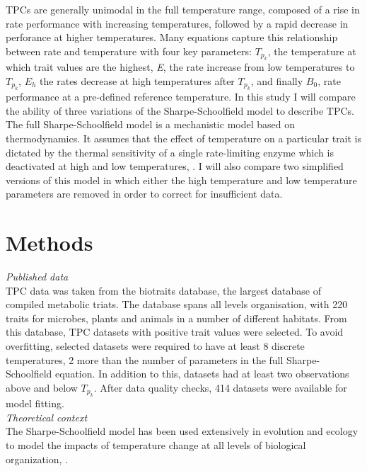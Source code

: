 \documentclass[11pt]{article}
\begin{document}
\noindent
TPCs are generally unimodal in the full temperature range, composed of a rise in rate performance with increasing temperatures, followed by a rapid decrease in perforance at higher temperatures. Many equations capture this relationship between rate and temperature with four key parameters: ${T_p_k}$, the temperature at which trait values are the highest, \textit{E}, the rate increase from low temperatures to ${T_p_k}$, ${E_h}$ the rates decrease at high temperatures after ${T_p_k}$, and finally ${B_0}$, rate performance at a pre-defined reference temperature. In this study I will compare the ability of three variations of the Sharpe-Schoolfield model to describe TPCs. The full Sharpe-Schoolfield model is a mechanistic model based on thermodynamics. It assumes that the effect of temperature on a particular trait is dictated by the thermal sensitivity of a single rate-limiting enzyme which is deactivated at high and low temperatures, \cite{R.MS1981}. I will also compare two simplified versions of this model in which either the high temperature and low temperature parameters are removed in order to correct for insufficient data.


\section*{Methods}

\textit{Published data}\\
TPC data was taken from the biotraits database, the largest database of compiled metabolic triats\cite{Dell2013}. The database spans all levels organisation, with 220 traits for microbes, plants and animals in a number of different habitats. From this database, TPC datasets with positive trait values were selected. To avoid overfitting, selected datasets were required to have at least 8 discrete temperatures, 2 more than the number of parameters in the full Sharpe-Schoolfield equation. In addition to this, datasets had at least two observations above and below ${T_p_k}$. After data quality checks, 414 datasets were available for model fitting.\\

\noindent
\textit{Theoretical context}\\
The Sharpe-Schoolfield model has been used extensively in evolution and ecology to model the impacts of temperature change at all levels of biological organization, \cite{Barmak2014, Barneche2016, Padfield2016}.\\
\end{document}

